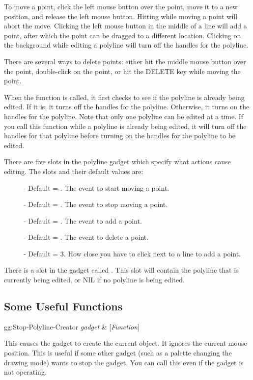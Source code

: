 To move a point,
click the left mouse button over the point, move it to a new position,
and release the left mouse button.  Hitting  while moving a
point will abort the move.  Clicking the left mouse button in the middle of
a line will add a point, after which the point can be dragged to a different
location. Clicking on the background while editing a polyline
will turn off the handles for the polyline.

There are several ways to delete points:  either hit the middle mouse button
over the point, double-click on the point, or hit the DELETE key while
moving the point.

When the  function is called, it first checks
to see if the polyline is already being edited.  If it is, it turns
off the handles for the polyline.  Otherwise, it turns on the handles
for the polyline.  Note that only one polyline can be edited at a
time.  If you call this function while a polyline is already being
edited, it will turn off the handles for that polyline before turning
on the handles for the polyline to be edited.

There are five slots in the polyline gadget which specify what actions
cause editing.  The slots and their default values are:

\begin{description}
\item[]  - Default = .  The event to start moving
a point.

\item[]  - Default = . The event to stop moving a
point.

\item[]  - Default = .  The event to add a point.

\item[]  - Default = .  The event to delete a
point.

\item[]  - Default = 3.  How close you have to click next to a line
to add a point.
\end{description}

There is a slot in the gadget called .  This
slot will contain the polyline that is currently being edited, or NIL
if no polyline is being edited.


\subsection{Some Useful Functions}
\begin{programexample}
gg:Stop-Polyline-Creator {\it gadget} & [{\it Function}]
\end{programexample}
This causes the gadget to create the current object.  It ignores the
current mouse position.  This is useful if some other gadget (such as a
palette changing the drawing mode) wants to stop the gadget.  You can call
this even if the gadget is not operating.

